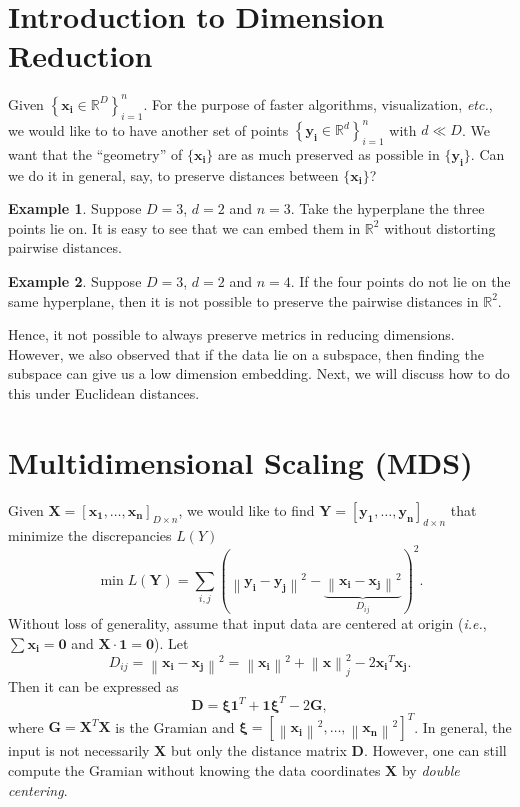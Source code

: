 \documentclass[11pt]{article}
\newcommand{\norm}[1]{\left\lVert#1\right\rVert}
\theoremstyle{definition}
\newtheorem{Example}{Example}
\begin{document}
\section{Introduction to Dimension Reduction}
Given $\left\{\mathbf{x_i} \in \mathbb{R}^D\right\}_{i=1}^n$. For the purpose of faster algorithms, visualization, \textit{etc.}, we  would like to  to have another set of points  $\left\{\mathbf{y_i}\in\mathbb{R}^d\right\}_{i=1}^n $ with $d\ll D$. We want that the ``geometry'' of $\{\mathbf{x_i}\}$ are as much preserved as possible in $\{\mathbf{y_i}\}$. Can we do it in general, say, to preserve distances between $\{\mathbf{x_i}\}$?
\begin{Example}
    Suppose $D=3$, $d=2$ and $n=3$. Take the hyperplane the three points lie on. It is easy to see that we can embed them in $\mathbb{R}^2$ without distorting pairwise distances.
\end{Example}
\begin{Example}
    Suppose $D=3$, $d=2$ and $n=4$. If the four points do not lie on the same hyperplane, then it is not possible to preserve the pairwise distances in $\mathbb{R}^2$.
\end{Example}
Hence, it not possible to always preserve metrics in reducing dimensions. However, we also observed that if the data lie on a subspace, then finding the subspace can give us a low dimension embedding. Next, we will discuss how to do this under Euclidean distances.

\section{Multidimensional Scaling (MDS)}
Given $\mathbf{X} = [\mathbf{x_1},\ldots,\mathbf{x_n}]_{D\times n}$, we would like to find $\mathbf{Y}= [\mathbf{y_1},\ldots, \mathbf{y_n}]_{d\times n}$ that minimize the discrepancies $L(Y)$
\begin{equation}\label{eqn:otp}
    \min L(\mathbf{Y}) = \sum_{i,j} \left(\norm{\mathbf{y_i}-\mathbf{y_j}}^2-\underbrace{\norm{\mathbf{x_i}-\mathbf{x_j}}^2}_{D_{ij}}\right)^2.
\end{equation}
Without loss of generality, assume that input data are centered at origin (\textit{i.e.}, $\sum \mathbf{x_i} = \mathbf{0}$ and $\mathbf{X}\cdot \mathbf{1} = \mathbf{0}$).  Let $$D_{ij} = \norm{\mathbf{x_i}-\mathbf{x_j}}^2 = \norm{\mathbf{x_i}}^2 + \norm{\mathbf{x}}_j^2 - 2\mathbf{x_i}^T\mathbf{x_j}.$$ Then it can be expressed as
\[
    \mathbf{D} = \bm{\xi}\mathbf{1}^T +  \mathbf{1}\bm{\xi}^T - 2\bm{G}, 
\]
where $\mathbf{G} = \mathbf{X}^T\mathbf{X}$ is the Gramian and $\bm{\xi} = \left[\norm{\mathbf{x_i}}^2 , \ldots, \norm{\mathbf{x_n}}^2\right]^T$. In general, the input is not necessarily $\mathbf{X}$ but only the distance matrix $\mathbf{D}$. However, one can still compute the Gramian without knowing the data coordinates $\mathbf{X}$ by \textit{double centering}.
\end{document}
